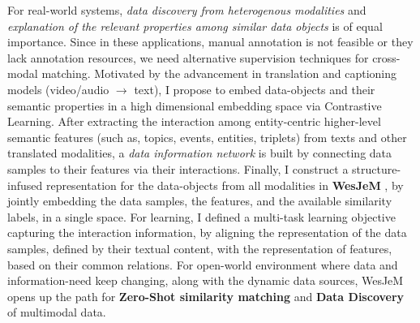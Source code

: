 For real-world systems, \textit{data discovery 
from heterogenous modalities}
and \textit{explanation of the relevant properties among similar data objects} is of equal importance. 
Since in these applications, manual annotation is not feasible or they lack annotation resources, we need alternative supervision techniques for cross-modal matching. 
%
Motivated by the advancement in translation and captioning models (video/audio $\rightarrow$ text), I propose to embed data-objects and their semantic properties in a high dimensional embedding space via Contrastive Learning. 
After extracting the interaction among entity-centric higher-level semantic features (such as, topics, events, entities, triplets) from texts and other translated modalities, a \textit{data information network} is built by connecting data samples to
their features via their interactions.
Finally, I construct a structure-infused representation for the data-objects from all modalities in \textbf{WesJeM} \cite{solaiman2022open}, by jointly embedding the data samples, the features, and the available similarity labels, 
in a single space.
%
For learning, I defined a multi-task learning objective capturing the interaction information,
by aligning the
representation of the data samples, defined by their textual content, with the representation of features, based on their common relations. 
%
For open-world environment where data and information-need keep changing, along with the dynamic data sources, WesJeM opens up the path for \textbf{Zero-Shot similarity matching} and \textbf{Data Discovery} of multimodal data.
